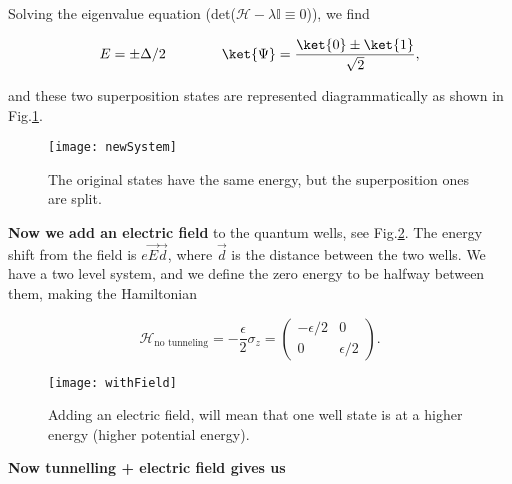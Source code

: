    \noindent Solving the eigenvalue equation (det($\mathcal{H}-\lambda\mathbb{I}\equiv0$)), we find
   
   \begin{equation}
	   \label{l1-solutionFirst}
	   E = \pm\Delta/2\qquad\qquad\ket{\Psi}=\frac{\ket{0}\pm\ket{1}}{\sqrt{2}},
   \end{equation}
   
   \noindent and these two superposition states are represented diagrammatically as shown in Fig.\ref{fig:newSystem}.
   
   \begin{figure}[h]
   	\begin{center}
   		\texttt{[image: newSystem]}
	   	\caption{\small The original states have the same energy, but the superposition ones are split. \label{fig:newSystem}}
   	\end{center}
   \end{figure}
   
   \textbf{Now we add an electric field} to the quantum wells, see Fig.\ref{fig:withField}. The energy shift from the field is $e\vec{E}\vec{d}$, where $\vec{d}$ is the distance between the two wells. We have a two level system, and we define the zero energy to be halfway between them, making the Hamiltonian
   
   \begin{equation}
   \label{l1-1}
   \mathcal{H}_{\text{no tunneling}} = -\frac{\epsilon}{2}\sigma_z = \left(\begin{matrix}
   -\epsilon/2 & 0\\ 0 & \epsilon/2
   \end{matrix}\right).
   \end{equation}
   
   \begin{figure}
   	\begin{center}
   		\texttt{[image: withField]}
   		\caption{\small Adding an electric field, will mean that one well state is at a higher energy (higher potential energy).}
   		\label{fig:withField}
   	\end{center}
   \end{figure}

   \textbf{Now tunnelling + electric field gives us }
   
